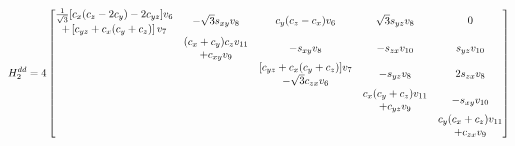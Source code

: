 \documentclass[twocolumn,showpacs,preprintnumbers,superscriptaddress,prb,floatfix,aps,10pt]{revtex4-1}
\begin{document}
\begin{widetext}
\begin{equation}
H_2^{dd} = 4
\begin{bmatrix}
 \tfrac{1}{\sqrt{3}} [c_{x} (c_{z}-2 c_{y})-2 c_{yz}] v_{6} & \multirow{2}{*}{$-\sqrt{3} s_{xy} v_{8}$} & \multirow{2}{*}{$c_{y} (c_{z}-c_{x}) v_{6}$}    & \multirow{2}{*}{$\sqrt{3} s_{yz} v_{8}$} & \multirow{2}{*}{$0$}               \\
             +\left[c_{yz}+c_{x} (c_{y}+c_{z})\right] v_{7} &                                           &                                                 &                                          &                                    \\
\multirow{2}{*}{ }                                          &      (c_{x}+c_{y}) c_{z} v_{11}           & \multirow{2}{*}{$-s_{xy} v_{8}$}                & \multirow{2}{*}{$-s_{zx} v_{10}$}        & \multirow{2}{*}{$ s_{yz} v_{10}$}  \\    
                                                            &                  +c_{xy} v_{9}            &                                                 &                                          &                                    \\
\multirow{2}{*}{ }                                          & \multirow{2}{*}{ }                        &     [c_{yz}+c_{x} (c_{y}+c_{z})] v_{7}          & \multirow{2}{*}{$-s_{yz} v_{8}$}         & \multirow{2}{*}{$2 s_{zx} v_{8}$}  \\ 
                                                            &                                           &                 -\sqrt{3} c_{zx} v_{6}          &                                          &                                    \\
\multirow{2}{*}{ }                                          & \multirow{2}{*}{ }                        & \multirow{2}{*}{ }                              &      c_{x} (c_{y}+c_{z}) v_{11}          & \multirow{2}{*}{$-s_{xy} v_{10}$}  \\
                                                            &                                           &                                                 &                  +c_{yz} v_{9}           &                                    \\
\multirow{2}{*}{ }                                          & \multirow{2}{*}{ }                        & \multirow{2}{*}{ }                              & \multirow{2}{*}{ }                       &      c_{y} (c_{x}+c_{z}) v_{11}    \\
                                                            &                                           &                                                 &                                          &                  +c_{zx} v_{9}     \\
\end{bmatrix}
\end{equation}
\end{widetext}
\end{document}
